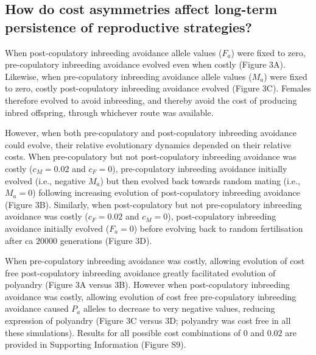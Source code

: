\documentclass[10pt,letterpaper]{article}
\begin{document}
\subsection*{How do cost asymmetries affect long-term persistence of reproductive strategies?}

When post-copulatory inbreeding avoidance allele values ($F_{a}$) were fixed to zero, pre-copulatory inbreeding avoidance evolved even when costly (Figure 3A). Likewise, when pre-copulatory inbreeding avoidance allele values ($M_{a}$) were fixed to zero, costly post-copulatory inbreeding avoidance evolved (Figure 3C). Females therefore evolved to avoid inbreeding, and thereby avoid the cost of producing inbred offspring, through whichever route was available. 

However, when both pre-copulatory and post-copulatory inbreeding avoidance could evolve, their relative evolutionary dynamics depended on their relative costs. When pre-copulatory but not post-copulatory inbreeding avoidance was costly ($c_{M}=0.02$ and $c_{F}=0$), pre-copulatory inbreeding avoidance initially evolved (i.e., negative $M_{a}$) but then evolved back towards random mating (i.e., $M_{a}=0$) following increasing evolution of post-copulatory inbreeding avoidance (Figure 3B). Similarly, when post-copulatory but not pre-copulatory inbreeding avoidance was costly ($c_{F}=0.02$ and $c_{M}=0$), post-copulatory inbreeding avoidance initially evolved ($F_{a}=0$) before evolving back to random fertilisation after ca $20000$ generations (Figure 3D).

When pre-copulatory inbreeding avoidance was costly, allowing evolution of cost free post-copulatory inbreeding avoidance greatly facilitated evolution of polyandry (Figure 3A versus 3B). However when post-copulatory inbreeding avoidance was costly, allowing evolution of cost free pre-copulatory inbreeding avoidance caused $P_{a}$ alleles to decrease to very negative values, reducing expression of polyandry (Figure 3C versus 3D; polyandry was cost free in all these simulations). Results for all possible cost combinations of $0$ and $0.02$ are provided in Supporting Information (Figure S9).
\end{document}
